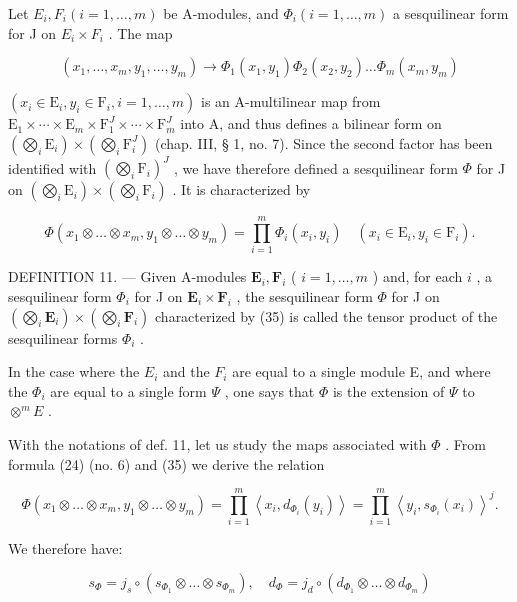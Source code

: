 Let \(E_{i}, F_{i} (i = 1, \ldots, m)\) be A-modules, and \(\Phi_{i} (i = 1, \ldots, m)\) a sesquilinear form for J on \(E_{i} \times F_{i}\) . The map

\[
(x _ {1}, \dots , x _ {m}, y _ {1}, \dots , y _ {m}) \rightarrow \Phi_ {1} (x _ {1}, y _ {1}) \Phi_ {2} (x _ {2}, y _ {2}) \dots \Phi_ {m} (x _ {m}, y _ {m})
\]

\((x_{i} \in \mathrm{E}_{i}, y_{i} \in \mathrm{F}_{i}, i = 1, \ldots, m)\) is an A-multilinear map from \(\mathrm{E}_{1} \times \cdots \times \mathrm{E}_{m} \times \mathrm{F}_{1}^{J} \times \cdots \times \mathrm{F}_{m}^{J}\) into A, and thus defines a bilinear form on \((\bigotimes_{i} \mathrm{E}_{i}) \times (\bigotimes_{i} \mathrm{F}_{i}^{J})\) (chap. III, § 1, no. 7). Since the second factor has been identified with \((\bigotimes_{i} \mathrm{F}_{i})^{J}\) , we have therefore defined a sesquilinear form \(\Phi\) for J on \((\bigotimes_{i} \mathrm{E}_{i}) \times (\bigotimes_{i} \mathrm{F}_{i})\) . It is characterized by

\[
\Phi (x _ {1} \otimes \dots \otimes x _ {m}, y _ {1} \otimes \dots \otimes y _ {m}) = \prod_ {i = 1} ^ {m} \Phi_ {i} (x _ {i}, y _ {i}) \quad (x _ {i} \in \mathrm{E} _ {i}, y _ {i} \in \mathrm{F} _ {i}).\tag{35}
\]

DEFINITION 11. --- Given A-modules \(\mathbf{E}_{i}, \mathbf{F}_{i}\) ( \(i=1,\ldots,m\) ) and, for each \(i\) , a sesquilinear form \(\Phi_{i}\) for J on \(\mathbf{E}_{i} \times \mathbf{F}_{i}\) , the sesquilinear form \(\Phi\) for J on \((\bigotimes_{i}\mathbf{E}_{i}) \times (\bigotimes_{i}\mathbf{F}_{i})\) characterized by (35) is called the tensor product of the sesquilinear forms \(\Phi_{i}\) .

In the case where the \(E_{i}\) and the \(F_{i}\) are equal to a single module E, and where the \(\Phi_{i}\) are equal to a single form \(\Psi\) , one says that \(\Phi\) is the extension of \(\Psi\) to \(\otimes^{m}E\) .

With the notations of def. 11, let us study the maps associated with \(\Phi\) . From formula (24) (no. 6) and (35) we derive the relation

\[
\Phi (x _ {1} \otimes \dots \otimes x _ {m}, y _ {1} \otimes \dots \otimes y _ {m}) = \prod_ {i = 1} ^ {m} \left\langle x _ {i}, d _ {\Phi_ {i}} (y _ {i}) \right\rangle = \prod_ {i = 1} ^ {m} \left\langle y _ {i}, s _ {\Phi_ {i}} (x _ {i}) \right\rangle^ {j}.
\]

We therefore have:

\[
s _ {\Phi} = j _ {s} \circ (s _ {\Phi_ {1}} \otimes \dots \otimes s _ {\Phi_ {m}}), \quad d _ {\Phi} = j _ {d} \circ (d _ {\Phi_ {1}} \otimes \dots \otimes d _ {\Phi_ {m}})\tag{36}
\]

